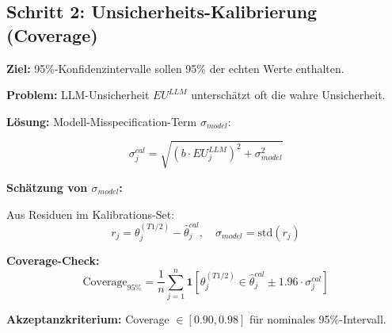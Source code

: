 \subsection{Schritt 2: Unsicherheits-Kalibrierung (Coverage)}

\begin{tcolorbox}[colback=gray!5!white, colframe=gray!75!black,
    title=\textbf{Axiom CAL-3: Coverage-Kalibrierung}]

\textbf{Ziel:} 95\%-Konfidenzintervalle sollen 95\% der echten Werte enthalten.

\textbf{Problem:} LLM-Unsicherheit $EU^{LLM}$ unterschätzt oft die wahre Unsicherheit.

\textbf{Lösung:} Modell-Misspecification-Term $\sigma_{model}$:

\begin{equation}
\boxed{\sigma_j^{cal} = \sqrt{(b \cdot EU_j^{LLM})^2 + \sigma_{model}^2}}
\end{equation}

\textbf{Schätzung von $\sigma_{model}$:}

Aus Residuen im Kalibrations-Set:
\begin{equation}
r_j = \theta_j^{(T1/2)} - \hat{\theta}_j^{cal}, \quad \sigma_{model} = \text{std}(r_j)
\end{equation}

\textbf{Coverage-Check:}
\begin{equation}
\text{Coverage}_{95\%} = \frac{1}{n} \sum_{j=1}^{n} \mathbf{1}\left[\theta_j^{(T1/2)} \in \hat{\theta}_j^{cal} \pm 1.96 \cdot \sigma_j^{cal}\right]
\end{equation}

\textbf{Akzeptanzkriterium:} Coverage $\in [0.90, 0.98]$ für nominales 95\%-Intervall.

\end{tcolorbox}

